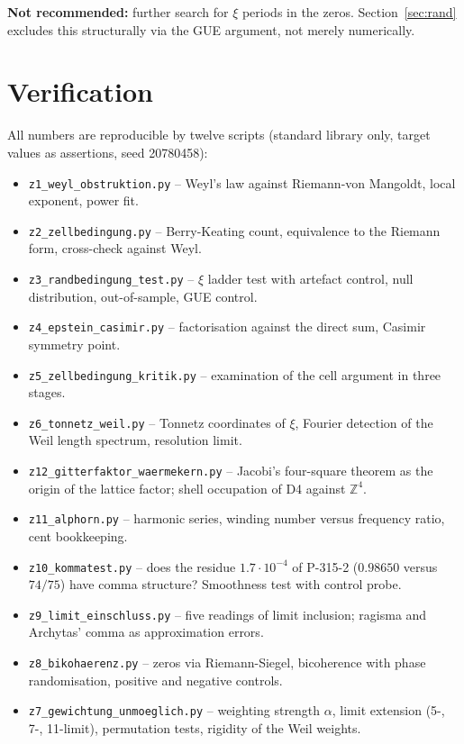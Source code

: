 \textbf{Not recommended:} further search for $\xi$ periods in the
zeros. Section~\ref{sec:rand} excludes this structurally via the GUE
argument, not merely numerically.

\section{Verification}

All numbers are reproducible by twelve scripts (standard library only,
target values as assertions, seed 20780458):

\begin{itemize}
  \item \texttt{z1\_weyl\_obstruktion.py} -- Weyl's law against
    Riemann-von Mangoldt, local exponent, power fit.
  \item \texttt{z2\_zellbedingung.py} -- Berry-Keating count,
    equivalence to the Riemann form, cross-check against Weyl.
  \item \texttt{z3\_randbedingung\_test.py} -- $\xi$ ladder test with
    artefact control, null distribution, out-of-sample, GUE control.
  \item \texttt{z4\_epstein\_casimir.py} -- factorisation against the
    direct sum, Casimir symmetry point.
  \item \texttt{z5\_zellbedingung\_kritik.py} -- examination of the
    cell argument in three stages.
  \item \texttt{z6\_tonnetz\_weil.py} -- Tonnetz coordinates of $\xi$,
    Fourier detection of the Weil length spectrum, resolution limit.
  \item \texttt{z12\_gitterfaktor\_waermekern.py} -- Jacobi's
    four-square theorem as the origin of the lattice factor; shell
    occupation of D4 against $\mathbb{Z}^4$.
  \item \texttt{z11\_alphorn.py} -- harmonic series, winding number
    versus frequency ratio, cent bookkeeping.
  \item \texttt{z10\_kommatest.py} -- does the residue $1.7\cdot10^{-4}$ of P-315-2
    ($0.98650$ versus $74/75$) have comma structure? Smoothness test with control probe.
  \item \texttt{z9\_limit\_einschluss.py} -- five readings of limit
    inclusion; ragisma and Archytas' comma as approximation errors.
  \item \texttt{z8\_bikohaerenz.py} -- zeros via Riemann-Siegel,
    bicoherence with phase randomisation, positive and negative
    controls.
  \item \texttt{z7\_gewichtung\_unmoeglich.py} -- weighting strength
    $\alpha$, limit extension (5-, 7-, 11-limit), permutation tests,
    rigidity of the Weil weights.
\end{itemize}

